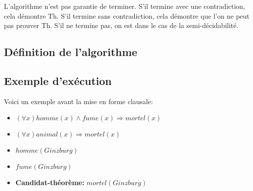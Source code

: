 {L'algorithme n'est pas garantie de terminer.
S'il termine avec une contradiction, cela démontre $\mathrm{Th}$.
S'il termine sans contradiction, cela démontre que l'on ne peut pas prouver $\mathrm{Th}$.
S'il ne termine pas, on est dans le cas de la semi-décidabilité.

\subsection{Définition de l'algorithme}

\begin{algorithm}
\end{algorithm}

\subsection{Exemple d'exécution}
Voici un exemple avant la mise en forme clausale:
\begin{itemize}
  \item $(\forall x) \mathit{homme}(x) \wedge \mathit{fume}(x) \Rightarrow \mathit{mortel}(x)$
  \item $(\forall x) \mathit{animal}(x) \Rightarrow \mathit{mortel}(x)$
  \item $\mathit{homme}(\mathit{Ginzburg})$
  \item $\mathit{fume}(\mathit{Ginzburg})$
  \item \textbf{Candidat-théorème:} $\mathit{mortel}(\mathit{Ginzburg})$
\end{itemize}

}
